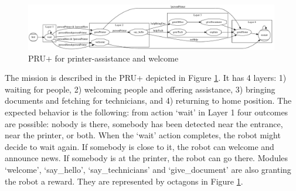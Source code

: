 \begin{figure}
\centering
\includegraphics[width=0.99\textwidth]{fig/PRU}
\caption{PRU+ for printer-assistance and welcome}
\label{fig:pru}
\end{figure}

The mission is described in the PRU+ depicted in Figure \ref{fig:pru}. It has 4 layers: 1) waiting for people, 2) welcoming people and offering assistance, 3) bringing documents and fetching for technicians, and 4) returning to home position.
The expected behavior is the following:
from action `wait' in Layer 1 four outcomes are possible: nobody is there, somebody has been detected near the entrance, near the printer, or both. When the `wait' action completes, the robot might decide to wait again. If somebody is close to it, the robot can welcome and announce news. If somebody is at the printer, the robot can go there.
Modules `welcome', `say\_hello', `say\_technicians' and `give\_document' are also granting the robot a reward. They are represented by octagons in Figure  \ref{fig:pru}.

%

